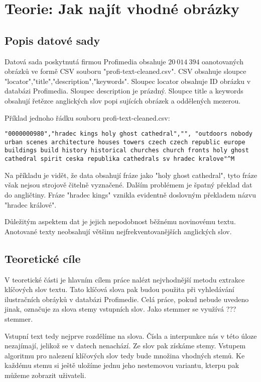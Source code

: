 \chapter{Teorie: Jak najít vhodné obrázky}

\section{Popis datové sady}

Datová sada poskytnutá firmou Profimedia obsahuje $20\ 014\ 394$ oanotovaných obrázků ve formě CSV souboru "profi-text-cleaned.csv". CSV obsahuje sloupce "locator","title","description","keywords". Sloupec locator obsahuje ID obrázku v databázi Profimedia. Sloupec description je prázdný. Sloupce title a keywords obsahují řetězce anglických slov popi sujících obrázek a oddělených mezerou.

Příklad jednoho řádku souboru profi-text-cleaned.csv:


\begin{lstlisting}
"0000000980","hradec kings holy ghost cathedral","", "outdoors nobody urban scenes architecture houses towers czech czech republic europe buildings build history historical churches church fronts holy ghost cathedral spirit ceska republika cathedrals sv hradec kralove"^M
\end{lstlisting}

Na příkladu je vidět, že data obsahují fráze jako "holy ghost cathedral", tyto fráze však nejsou strojově čitelně vyznačené. Dalším problémem je špatný překlad dat do angličtiny. Fráze "hradec kings" vznikla evidentně doslovným překladem názvu "hradec králové".

Důležitým aspektem dat je jejich nepodobnost běžnému novinovému textu. Anotované texty neobsahují většinu nejfrekventovanějších anglických slov.

\section{Teoretické cíle}

V teoretické části je hlavním cílem práce nalézt nejvhodnější metodu extrakce klíčových slov textu. Tato klíčová slova pak budou použita při vyhledávání ilustračních obráyků v databázi Profimedie. Celá práce, pokud nebude uvedeno jinak, označuje za slova stemy vstupních slov. Jako stemmer se využívá ??? stemmer.

Vstupní text tedy nejprve rozdělíme na slova. Čísla a interpunkce nás v této úloze nezajímají, jelikož se v datech nenachází. Ze slov pak získáme stemy. Vstupem algoritmu pro nalezení klíčových slov tedy bude množina vhodných stemů. Ke každému stemu si ještě uložíme jednu jeho nestemovou variantu, kterpu pak můžeme zobrazit uživateli.

